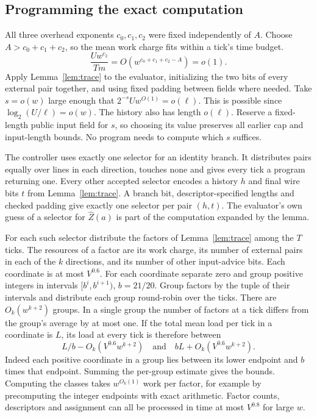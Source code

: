 

\subsection{Programming the exact computation}

All three overhead exponents $c_0,c_1,c_2$ were fixed independently
of $A$. Choose $A>c_0+c_1+c_2$, so the mean work charge fits within a tick's time budget.
\[
       \frac{Uw^{c_2}}{Tm}
       =O\!\left(w^{c_0+c_1+c_2-A}\right)=o(1).
\]
Apply
Lemma~\ref{lem:trace} to the evaluator, initializing the two bits
of every external pair together, and using fixed padding between fields
where needed. Take $s=o(w)$ large enough that
$2^{-s}U w^{O(1)}=o(\ell)$. This is possible since
$\log_2(U/\ell)=o(w)$. The history also has length $o(\ell)$.
Reserve a fixed-length public input field for $s$, so choosing its
value preserves all earlier cap and input-length bounds. No program
needs to compute which $s$ suffices.

The controller uses exactly one selector for an identity branch. It
distributes pairs equally over lines in each direction, touches none
and gives every tick a program returning one. Every other accepted selector encodes a history $h$ and final wire
bits $t$ from Lemma~\ref{lem:trace}. A branch bit, descriptor-specified
lengths and checked padding give exactly one selector per pair $(h,t)$.
The evaluator's own guess of a selector for $\widehat Z(a)$ is part of
the computation expanded by the lemma.

For each such selector distribute the factors of Lemma~\ref{lem:trace}
among the $T$ ticks. The resources of a factor are its work charge, its
number of external pairs in each of the $k$ directions, and its number
of other input-advice bits. Each coordinate is at most $V^{0.6}$.
For each coordinate separate zero
and group positive integers in intervals $[b^i,b^{i+1})$, $b=21/20$.
Group factors by the tuple of their intervals and distribute each group
round-robin over the ticks. There are $O_k(w^{k+2})$ groups. In a
single group the number of factors at a tick differs from the group's
average by at most one. If the total mean load per tick in a coordinate
is $L$, its load at every tick is therefore between
\[
             L/b-O_k(V^{0.6}w^{k+2})
           \quad\text{and}\quad
             bL+O_k(V^{0.6}w^{k+2}).
\]
Indeed each positive coordinate in a group lies between its lower
endpoint and $b$ times that endpoint. Summing the per-group estimate
gives the bounds. Computing the classes takes $w^{O_k(1)}$ work per
factor, for example by precomputing the integer endpoints with exact
arithmetic. Factor counts, descriptors and assignment can all be
processed in time at most $V^{0.8}$ for large $w$.

